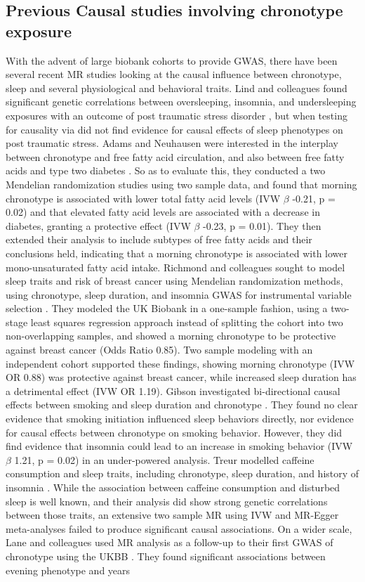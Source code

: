 \documentclass[journal,article,submit,moreauthors,pdftex]{Definitions/mdpi}
\begin{document}
\subsection{Previous Causal studies involving chronotype exposure}
With the advent of large biobank cohorts to provide GWAS, there have been several recent MR studies looking at the causal influence between chronotype, sleep and several physiological and behavioral traits. Lind and colleagues found significant genetic correlations between oversleeping, insomnia, and undersleeping exposures with an outcome of post traumatic stress disorder \cite{lind_molecular_2020}, but when testing for causality via did not find evidence for causal effects of sleep phenotypes on post traumatic stress. Adams and Neuhausen were interested in the interplay between chronotype and free fatty acid circulation, and also between free fatty acids and type two diabetes \cite{adams_evaluating_2019}. So as to evaluate this, they conducted a two Mendelian randomization studies using two sample data, and found that morning chronotype is associated with lower total fatty acid levels (IVW $\beta$ -0.21, p = 0.02) and that elevated fatty acid levels are associated with a decrease in diabetes, granting a protective effect (IVW $\beta$ -0.23, p = 0.01). They then extended their analysis to include subtypes of free fatty acids and their conclusions held, indicating that a morning chronotype is associated with lower mono-unsaturated fatty acid intake. Richmond and colleagues sought to model sleep traits and risk of breast cancer using Mendelian randomization methods, using chronotype, sleep duration, and insomnia GWAS for instrumental variable selection \cite{richmond_investigating_2019}. They modeled the UK Biobank in a one-sample fashion, using a two-stage least squares regression approach instead of splitting the cohort into two non-overlapping samples, and showed a morning chronotype to be protective against breast cancer (Odds Ratio 0.85). Two sample modeling with an independent cohort supported these findings, showing morning chronotype (IVW OR 0.88) was protective against breast cancer, while increased sleep duration has a detrimental effect (IVW OR 1.19). Gibson investigated bi-directional causal effects between smoking and sleep duration and chronotype \cite{gibson_evidence_2019}. They found no clear evidence that smoking initiation influenced sleep behaviors directly, nor evidence for causal effects between chronotype on smoking behavior. However, they did find evidence that insomnia could lead to an increase in smoking behavior (IVW $\beta$ 1.21, p = 0.02) in an under-powered analysis. Treur modelled caffeine consumption and sleep traits, including chronotype, sleep duration, and history of insomnia \cite{treur_investigating_2018}. While the association between caffeine consumption and disturbed sleep is well known, and their analysis did show strong genetic correlations between those traits, an extensive two sample MR using IVW and MR-Egger meta-analyses failed to produce significant causal associations. On a wider scale, Lane and colleagues used MR analysis as a follow-up to their first GWAS of chronotype using the UKBB \cite{lane_genome-wide_2016}. They found significant associations between evening phenotype and years 
\end{document}
